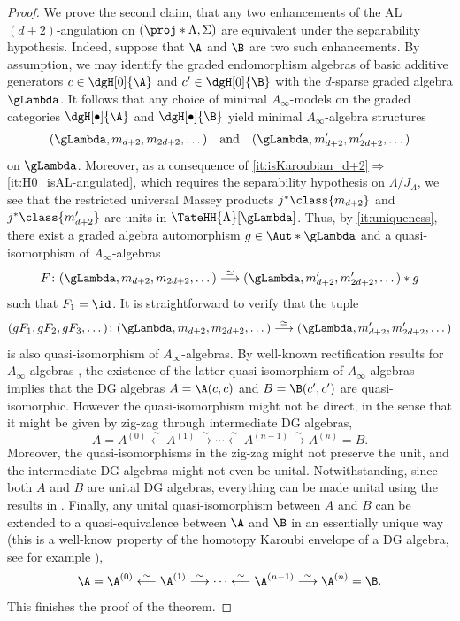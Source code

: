 \documentclass[a4paper]{amsart}
\begin{document}
\begin{proof}
  We prove the second claim, that any two enhancements of the AL
  $(d+2)$-angulation on $(\proj*{\Lambda},\Sigma)$ are equivalent under the
  separability hypothesis. Indeed, suppose that $\A$ and $\B$ are two such
  enhancements. By assumption, we may identify the graded endomorphism algebras
  of basic additive generators $c\in\dgH[0]{\A}$ and $c'\in\dgH[0]{\B}$ with the
  $d$-sparse graded algebra $\gLambda$. It follows that any choice of minimal
  $A_\infty$-models on the graded categories $\dgH[\bullet]{\A}$ and
  $\dgH[\bullet]{\B}$ yield minimal $A_\infty$-algebra structures
  \[
    (\gLambda,m_{d+2},m_{2d+2},\dots)\quad\text{and}\quad(\gLambda,m_{d+2}',m_{2d+2}',\dots)
  \]
  on $\gLambda$. Moreover, as a consequence of 
  \eqref{it:isKaroubian_d+2}$\Rightarrow$\eqref{it:H0_isAL-angulated}, which
  requires the separability hypothesis on $\Lambda/J_\Lambda$, we see
  that the restricted universal Massey products $j^*\class{m_{d+2}}$ and
  $j^*\class{m_{d+2}'}$ are units in $\TateHH{\Lambda}[\gLambda]$. Thus, by
  \eqref{it:uniqueness}, there exist a graded algebra
  automorphism $g\in\Aut*{\gLambda}$ and a quasi-iso\-mor\-phism of
  $A_\infty$-algebras
  \[
    F\colon(\gLambda,m_{d+2},m_{2d+2},\dots)\stackrel{\simeq}{\longrightarrow}(\gLambda,m_{d+2}',m_{2d+2}',\dots)*g
  \]
  such that $F_1=\id$. It is straightforward to verify that the tuple
  \[
    (gF_1,gF_2,gF_3,\dots)\colon(\gLambda,m_{d+2},m_{2d+2},\dots)\stackrel{\simeq}{\longrightarrow}(\gLambda,m_{d+2}',m_{2d+2}',\dots)
  \]
  is also quasi-isomorphism of $A_\infty$-algebras. By well-known rectification
  results for $A_\infty$-algebras \cite[Sec.~11.4.3]{LV12}, the existence of the
  latter quasi-isomorphism of $A_\infty$-algebras implies that the DG algebras
  $A=\A(c,c)$ and $B=\B(c',c')$ are quasi-isomorphic. However the
  quasi-isomorphism might not be direct, in the sense that it might be given by
  zig-zag through intermediate DG algebras,
  \begin{equation*}
    A=A^{(0)}\stackrel{\sim}{\longleftarrow}A^{(1)}\stackrel{\sim}{\longrightarrow}\cdots\stackrel{\sim}{\longleftarrow}A^{(n-1)}\stackrel{\sim}{\longrightarrow}A^{(n)}=B.
  \end{equation*}
  Moreover, the quasi-isomorphisms
  in the zig-zag might not preserve the unit, and the intermediate DG algebras
  might not even be unital. Notwithstanding, since both $A$ and $B$ are unital
  DG algebras, everything can be made unital using the results in
  \cite[Prop.~6.2]{Mur14}. Finally, any
  unital quasi-isomorphism between $A$ and $B$ can be extended to a
  quasi-equivalence between $\A$ and $\B$ in an essentially unique way (this is a well-know property of the
  homotopy Karoubi envelope of a DG algebra, see for example
  \cite[Sec.~4]{GHW21}), 
  \begin{equation*}
    \A=\A^{(0)}\stackrel{\sim}{\longleftarrow}\A^{(1)}\stackrel{\sim}{\longrightarrow}\cdots\stackrel{\sim}{\longleftarrow}\A^{(n-1)}\stackrel{\sim}{\longrightarrow}\A^{(n)}=\B.
  \end{equation*}
  This finishes the proof of the theorem.
\end{proof}
\end{document}
